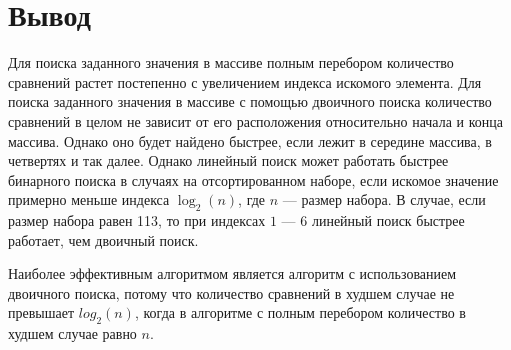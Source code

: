 \clearpage

\section{Вывод}

Для поиска заданного значения в массиве полным перебором количество сравнений растет
постепенно с увеличением индекса искомого элемента. Для поиска заданного значения
в массиве с помощью двоичного поиска количество сравнений в целом не зависит от
его расположения относительно начала и конца массива. Однако оно будет найдено быстрее, если лежит в середине массива, в четвертях и так далее.
Однако линейный поиск может работать быстрее бинарного поиска в случаях на отсортированном наборе,
если искомое значение примерно меньше индекса $\log_2(n)$, где $n$ --- размер набора. В случае,
если размер набора равен 113, то при индексах $1$ ---  $6$ линейный поиск быстрее работает, чем
двоичный поиск.

Наиболее эффективным алгоритмом является алгоритм с использованием двоичного поиска,
потому что количество сравнений в худшем случае не превышает $log_2(n)$, когда в алгоритме с
полным перебором количество в худшем случае равно $n$.

